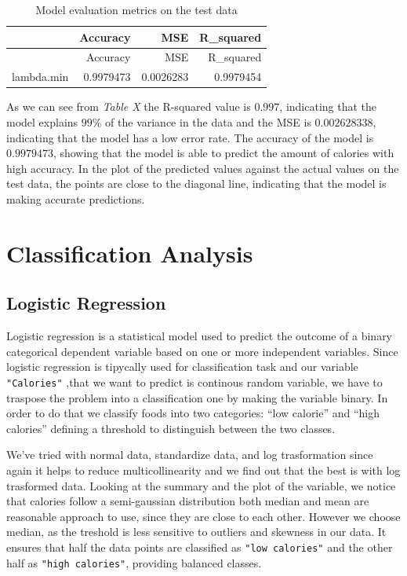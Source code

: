 \documentclass[
]{article}
\begin{document}
\begin{longtable}[]{@{}lrrr@{}}
\caption{Model evaluation metrics on the test data}\tabularnewline
\toprule\noalign{}
& Accuracy & MSE & R\_squared \\
\midrule\noalign{}
\endfirsthead
\toprule\noalign{}
& Accuracy & MSE & R\_squared \\
\midrule\noalign{}
\endhead
\bottomrule\noalign{}
\endlastfoot
lambda.min & 0.9979473 & 0.0026283 & 0.9979454 \\
\end{longtable}

As we can see from \emph{Table X} the R-squared value is \(0.997\),
indicating that the model explains \(99\)\% of the variance in the data
and the MSE is \(0.002628338\), indicating that the model has a low
error rate. The accuracy of the model is \(0.9979473\), showing that the
model is able to predict the amount of calories with high accuracy. In
the plot of the predicted values against the actual values on the test
data, the points are close to the diagonal line, indicating that the
model is making accurate predictions.

\section{Classification Analysis}\label{classification-analysis}

\subsection{Logistic Regression}\label{logistic-regression}

Logistic regression is a statistical model used to predict the outcome
of a binary categorical dependent variable based on one or more
independent variables. Since logistic regression is tipycally used for
classification task and our variable \texttt{"Calories"} ,that we want
to predict is continous random variable, we have to traspose the problem
into a classification one by making the variable binary. In order to do
that we classify foods into two categories: ``low calorie'' and ``high
calories'' defining a threshold to distinguish between the two classes.

We've tried with normal data, standardize data, and log trasformation
since again it helps to reduce multicollinearity and we find out that
the best is with log trasformed data. Looking at the summary and the
plot of the variable, we notice that calories follow a semi-gaussian
distribution both median and mean are reasonable approach to use, since
they are close to each other. However we choose median, as the treshold
is less sensitive to outliers and skewness in our data. It ensures that
half the data points are classified as \texttt{"low\ calories"} and the
other half as \texttt{"high\ calories"}, providing balanced classes.
\end{document}
